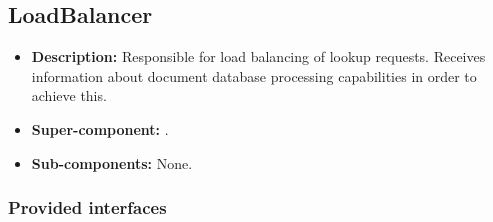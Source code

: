 \subsection{LoadBalancer}
\begin{itemize}
    \item \textbf{Description:} Responsible for load balancing of lookup requests. Receives information about document database processing capabilities in order to achieve this.
    \item \textbf{Super-component:} .
    \item \textbf{Sub-components:} None.
\end{itemize}

\subsubsection*{Provided interfaces}
